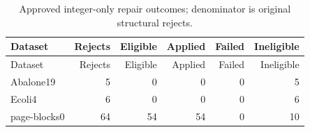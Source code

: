 \begin{longtable}{lrrrrr}
\caption{Approved integer-only repair outcomes; denominator is original structural rejects.}\label{tab:repair}\\
\toprule
Dataset & Rejects & Eligible & Applied & Failed & Ineligible \\
\midrule
\endfirsthead
\toprule
Dataset & Rejects & Eligible & Applied & Failed & Ineligible \\
\midrule
\endhead
Abalone19 & 5 & 0 & 0 & 0 & 5 \\
Ecoli4 & 6 & 0 & 0 & 0 & 6 \\
page-blocks0 & 64 & 54 & 54 & 0 & 10 \\
\bottomrule
\end{longtable}
